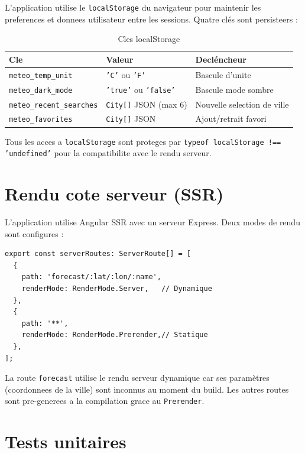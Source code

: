 \documentclass[12pt,a4paper]{article}
\begin{document}
L'application utilise le \texttt{localStorage} du navigateur pour maintenir les preferences et donnees utilisateur entre les sessions. Quatre clés sont persisteers :

\begin{table}[H]
\centering
\caption{Cles localStorage}
\begin{tabular}{lll}
\toprule
\textbf{Cle} & \textbf{Valeur} & \textbf{Decléncheur} \\
\midrule
\texttt{meteo\_temp\_unit} & \texttt{'C'} ou \texttt{'F'} & Bascule d'unite \\
\texttt{meteo\_dark\_mode} & \texttt{'true'} ou \texttt{'false'} & Bascule mode sombre \\
\texttt{meteo\_recent\_searches} & \texttt{City[]} JSON (max 6) & Nouvelle selection de ville \\
\texttt{meteo\_favorites} & \texttt{City[]} JSON & Ajout/retrait favori \\
\bottomrule
\end{tabular}
\end{table}

Tous les acces a \texttt{localStorage} sont proteges par \texttt{typeof localStorage !== 'undefined'} pour la compatibilite avec le rendu serveur.

\newpage
\section{Rendu cote serveur (SSR)}
\label{sec:ssr}

L'application utilise Angular SSR avec un serveur Express. Deux modes de rendu sont configures :

\begin{lstlisting}[style=angular, caption={Configuration des modes de rendu SSR}]
export const serverRoutes: ServerRoute[] = [
  {
    path: 'forecast/:lat/:lon/:name',
    renderMode: RenderMode.Server,   // Dynamique
  },
  {
    path: '**',
    renderMode: RenderMode.Prerender,// Statique
  },
];
\end{lstlisting}

La route \texttt{forecast} utilise le rendu serveur dynamique car ses paramètres (coordonnees de la ville) sont inconnus au moment du build. Les autres routes sont pre-generees a la compilation grace au \texttt{Prerender}.

\newpage
\section{Tests unitaires}
\label{sec:tests}
\end{document}

